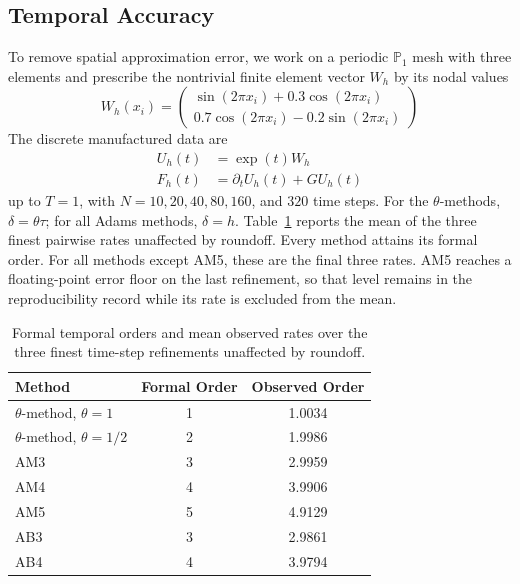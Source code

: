 \documentclass[11pt]{article}
\begin{document}

\subsection{Temporal Accuracy}
\label{subsec:numerical-temporal-accuracy}
To remove spatial approximation error, we work on a periodic \(\mathbb P_1\) mesh with
three elements and prescribe the nontrivial finite element vector \(W_h\) by
its nodal values
\begin{equation}
W_h(x_i)=
\begin{pmatrix}
\sin(2\pi x_i)+0.3\cos(2\pi x_i)\\
0.7\cos(2\pi x_i)-0.2\sin(2\pi x_i)
\end{pmatrix}
\label{eq:numerical-temporal-mode}
\end{equation}
The discrete manufactured data are
\begin{align}
U_h(t)&=\exp(t)W_h \label{eq:numerical-temporal-solution}\\
F_h(t)&=\partial_tU_h(t)+GU_h(t) \label{eq:numerical-temporal-forcing}
\end{align}
up to \(T=1\), with \(N=10,20,40,80,160\), and \(320\) time steps. For the
\(\theta\)-methods, \(\delta=\theta\tau\); for all Adams methods, \(\delta=h\).
Table~\ref{tab:numerical-temporal-orders} reports the mean of the three finest
pairwise rates unaffected by roundoff. Every method attains its formal order.
For all methods except AM5, these are the final three rates. AM5 reaches a
floating-point error floor on the last refinement, so that level remains in
the reproducibility record while its rate is excluded from the mean.

\begin{table}[htbp]
\centering
\begin{tabular}{lcc}
\toprule
Method & Formal Order & Observed Order \\
\midrule
\(\theta\)-method, \(\theta=1\) & 1 & 1.0034 \\
\(\theta\)-method, \(\theta=1/2\) & 2 & 1.9986 \\
AM3 & 3 & 2.9959 \\
AM4 & 4 & 3.9906 \\
AM5 & 5 & 4.9129 \\
AB3 & 3 & 2.9861 \\
AB4 & 4 & 3.9794 \\
\bottomrule
\end{tabular}
\caption{Formal temporal orders and mean observed rates over the three finest
time-step refinements unaffected by roundoff.}
\label{tab:numerical-temporal-orders}
\end{table}
\end{document}
